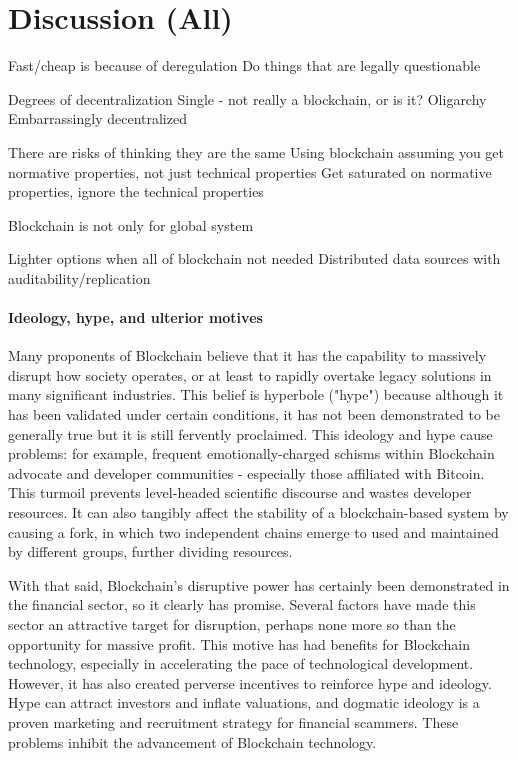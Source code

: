 
\section{Discussion (All)}

Fast/cheap is because of deregulation
	Do things that are legally questionable

Degrees of decentralization
	Single - not really a blockchain, or is it?
	Oligarchy
	Embarrassingly decentralized
	
There are risks of thinking they are the same
	Using blockchain assuming you get normative properties, not just technical properties
	Get saturated on normative properties, ignore the technical properties
	
Blockchain is not only for global system

Lighter options when all of blockchain not needed
	Distributed data sources with auditability/replication
	
\paragraph{Ideology, hype, and ulterior motives}
Many proponents of Blockchain believe that it has the capability to massively disrupt how society operates, or at least to rapidly overtake legacy solutions in many significant industries. This belief is hyperbole ("hype") because although it has been validated under certain conditions, it has not been demonstrated to be generally true but it is still fervently proclaimed. This ideology and hype cause problems: for example, frequent emotionally-charged schisms within Blockchain advocate and developer communities - especially those affiliated with Bitcoin. This turmoil prevents level-headed scientific discourse and wastes developer resources. It can also tangibly affect the stability of a blockchain-based system by causing a fork, in which two independent chains emerge to used and maintained by different groups, further dividing resources.

With that said, Blockchain's disruptive power has certainly been demonstrated in the financial sector, so it clearly has promise. Several factors have made this sector an attractive target for disruption, perhaps none more so than the opportunity for massive profit. This motive has had benefits for Blockchain technology, especially in accelerating the pace of technological development. However, it has also created perverse incentives to reinforce hype and ideology. Hype can attract investors and inflate valuations, and dogmatic ideology is a proven marketing and recruitment strategy for financial scammers. These problems inhibit the advancement of Blockchain technology.

